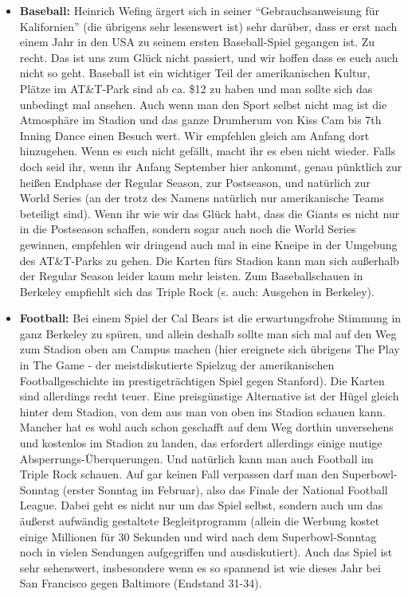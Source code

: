\documentclass[a4paper]{scrreprt}
\begin{document}
\begin{itemize}

	\item \textbf{Baseball:} Heinrich Wefing ärgert sich in seiner "`Gebrauchsanweisung für Kalifornien"' (die übrigens sehr lesenswert ist) sehr darüber, dass er erst nach einem Jahr in den USA zu seinem ersten Baseball-Spiel gegangen ist. Zu recht. Das ist uns zum Glück nicht passiert, und wir hoffen dass es euch auch nicht so geht. Baseball ist ein wichtiger Teil der amerikanischen Kultur, Plätze im AT\&T-Park sind ab ca. \$12 zu haben und man sollte sich das unbedingt mal ansehen. Auch wenn man den Sport selbst nicht mag ist die Atmosphäre im Stadion und das ganze Drumherum von Kiss Cam bis 7th Inning Dance einen Besuch wert. 
Wir empfehlen gleich am Anfang dort hinzugehen.
Wenn es euch nicht gefällt, macht ihr es eben nicht wieder.
Falls doch seid ihr, wenn ihr Anfang September hier ankommt, genau pünktlich zur heißen Endphase der Regular Season,
zur Postseason, und natürlich zur World Series
(an der trotz des Namens natürlich nur amerikanische Teams beteiligt sind).
Wenn ihr wie wir das Glück habt, dass die Giants es nicht nur in die Postseason schaffen, 
sondern sogar auch noch die World Series gewinnen, 
empfehlen wir dringend auch mal in eine Kneipe in der Umgebung des AT\&T-Parks zu gehen.
Die Karten fürs Stadion kann man sich außerhalb der Regular Season leider kaum mehr leisten.
Zum Baseballschauen in Berkeley empfiehlt sich das Triple Rock (s. auch: Ausgehen in Berkeley).

	\item \textbf{Football:} Bei einem Spiel der Cal Bears ist die erwartungsfrohe Stimmung in ganz Berkeley zu spüren, und allein deshalb sollte man sich mal auf den Weg zum Stadion oben am Campus machen (hier ereignete sich übrigens The Play in The Game - der meistdiskutierte Spielzug der amerikanischen Footballgeschichte im prestigeträchtigen Spiel gegen Stanford). Die Karten sind allerdings recht teuer. Eine preisgünstige Alternative ist der Hügel gleich hinter dem Stadion, von dem aus man von oben ins Stadion schauen kann. Mancher hat es wohl auch schon geschafft auf dem Weg dorthin unversehens und kostenlos im Stadion zu landen, das erfordert allerdings einige mutige Absperrungs-Überquerungen. Und natürlich kann man auch Football im Triple Rock schauen. Auf gar keinen Fall verpassen darf man den Superbowl-Sonntag (erster Sonntag im Februar), also das Finale der National Football League. Dabei geht es nicht nur um das Spiel selbst, sondern auch um das äußerst aufwändig gestaltete Begleitprogramm (allein die Werbung kostet einige Millionen für 30 Sekunden und wird nach dem Superbowl-Sonntag noch in vielen Sendungen aufgegriffen und ausdiskutiert). Auch das Spiel ist sehr sehenswert, insbesondere wenn es so spannend ist wie dieses Jahr bei San Francisco gegen Baltimore (Endstand 31-34).
	

\end{itemize}
\end{document}
